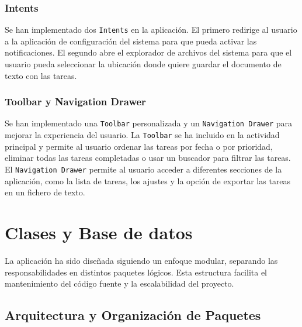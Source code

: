\documentclass{article}
\begin{document}
\subsubsection{Intents}

Se han implementado dos \texttt{Intents} en la aplicación. El primero redirige al usuario a la aplicación de configuración del sistema para que pueda activar las notificaciones. El segundo abre el explorador de archivos del sistema para que el usuario pueda seleccionar la ubicación donde quiere guardar el documento de texto con las tareas.

\subsubsection{Toolbar y Navigation Drawer}

Se han implementado una \texttt{Toolbar} personalizada y un \texttt{Navigation Drawer} para mejorar la experiencia del usuario. La \texttt{Toolbar} se ha incluido en la actividad principal y permite al usuario ordenar las tareas por fecha o por prioridad, eliminar todas las tareas completadas o usar un buscador para filtrar las tareas. El \texttt{Navigation Drawer} permite al usuario acceder a diferentes secciones de la aplicación, como la lista de tareas, los ajustes y la opción de exportar las tareas en un fichero de texto.


\newpage


\section{Clases y Base de datos}

La aplicación ha sido diseñada siguiendo un enfoque modular, separando las responsabilidades en distintos paquetes lógicos. Esta estructura facilita el mantenimiento del código fuente y la escalabilidad del proyecto.

\subsection{Arquitectura y Organización de Paquetes}
\end{document}
